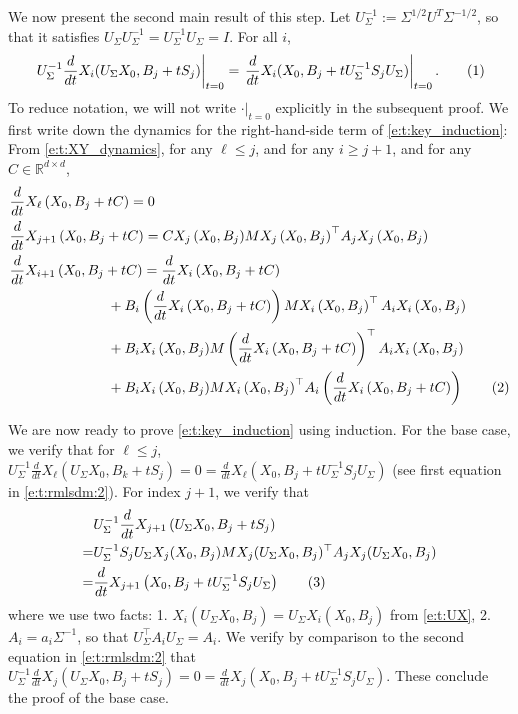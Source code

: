 \documentclass{article}
\newcommand{\R}{\mathbb{R}}
\newcommand*\lrp[1]{\left( #1 \right)}
\newcommand\numberthis{\addtocounter{equation}{1}\tag{\theequation}}
\newcommand*\at[2]{\left.#1\right|_{#2}}
\newcommand{\US}{U_\Sigma}
\begin{document}
We now present the second main result of this step. Let $\US^{-1} := \Sigma^{1/2} U^T \Sigma^{-1/2}$, so that it satisfies $\US \US^{-1}= \US^{-1} \US = I$. For all $i$,
\begin{align*}
\at{\US^{-1} \frac{d}{dt} X_i(\US X_0, B_j + t S_j)}{t=0} = \at{\frac{d}{dt} X_i(X_0, B_j + t \US^{-1} S_j \US)}{t=0}.
\numberthis \label{e:t:key_induction}
\end{align*}
To reduce notation, we will not write $\at{\cdot}{t=0}$ explicitly in the subsequent proof. We first write down the dynamics for the right-hand-side term of \eqref{e:t:key_induction}:
From \eqref{e:t:XY_dynamics}, for any $\ell \leq j$, and for any $i \geq j+1$, and for any $C\in \R^{d\times d}$,
\begin{align*}
& \frac{d}{dt} X_{\ell} \lrp{X_0, B_j + t C} = 0\\
& \frac{d}{dt} X_{j+1} \lrp{X_0, B_j + t C} = C {X_{j}\lrp{X_0, B_j}} M {X_{j}\lrp{X_0, B_j}}^{\top} A_j  {X_{j}\lrp{X_0, B_j}}\\
& \frac{d}{dt} X_{i+1} \lrp{X_0, B_j + t C}
= \frac{d}{dt} X_{i} \lrp{X_0, B_j + t C}\\
&\qquad\qquad\qquad\quad + B_i \lrp{\frac{d}{dt} X_{i}\lrp{X_0, B_j + t C}} M X_{i}\lrp{X_0, B_j}^{\top} A_i  X_{i}\lrp{X_0, B_j}\\
&\qquad\qquad\qquad\quad + B_i {X_{i}\lrp{X_0, B_j}} M \lrp{\frac{d}{dt} X_{i}\lrp{X_0, B_j + tC}}^{\top} A_i  X_{i}\lrp{X_0, B_j}\\
&\qquad\qquad\qquad\quad + B_i {X_{i}\lrp{X_0, B_j}} M {X_{i}\lrp{X_0, B_j}}^{\top} A_i  \lrp{\frac{d}{dt}X_{i}\lrp{X_0, B_j+tC}}
\numberthis \label{e:t:rmlsdm:2}
\end{align*}

We are now ready to prove \eqref{e:t:key_induction} using induction. For the base case, we verify that for $\ell \leq j$, $\US^{-1} \frac{d}{dt} X_{\ell} \lrp{\US X_0, B_k + tS_j} = 0 = \frac{d}{dt} X_{\ell} \lrp{X_0, B_j + t\US^{-1} S_j \US}$ (see first equation in \eqref{e:t:rmlsdm:2}). For index $j+1$, we verify that
\begin{align*}
& \US^{-1} \frac{d}{dt} X_{j+1} \lrp{\US X_0, B_j + t S_j} \\
=& \US^{-1} S_j \US X_j( X_0, B_j) M X_j(\US X_0, B_j)^\top A_j X_j(\US X_0, B_j)\\
=& \frac{d}{dt} X_{j+1} \lrp{X_0, B_j + t \US^{-1} S_j \US}
\numberthis \label{e:t:rmlsdm:4}
\end{align*}
where we use two facts:  1. $X_i(\US X_0, B_j) = \US X_i(X_0, B_j)$ from \eqref{e:t:UX}, 2. $A_i = a_i \Sigma^{-1}$, so that $\US^{\top} A_i \US = A_i$. We verify by comparison to the second equation in \eqref{e:t:rmlsdm:2} that $\US^{-1} \frac{d}{dt} X_{j} \lrp{\US X_0, B_j + tS_j} = 0 = \frac{d}{dt} X_{j} \lrp{X_0, B_j + t\US^{-1} S_j \US}$. These conclude the proof of the base case.
\end{document}
